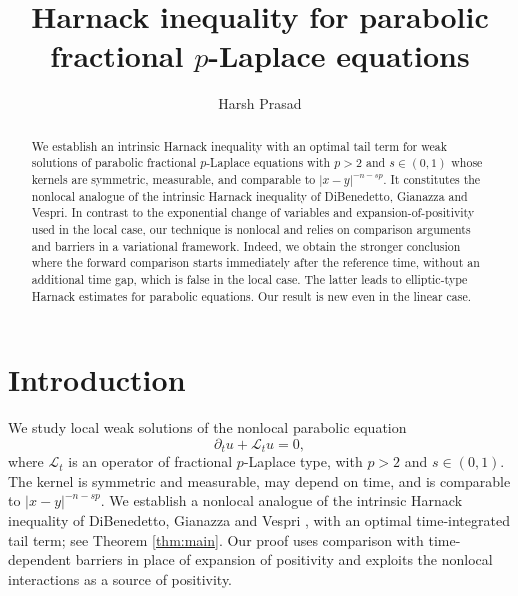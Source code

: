 \documentclass[10pt]{amsart}
\theoremstyle{plain}
\theoremstyle{definition}
\theoremstyle{remark}
\numberwithin{equation}{section}
\begin{document}
\title[Intrinsic Harnack inequality]
{Harnack inequality for parabolic fractional
$p$-Laplace equations}

\begin{abstract}
We establish an intrinsic Harnack inequality with an optimal tail term for weak solutions of parabolic fractional $p$-Laplace equations with $p>2$
and $s\in(0,1)$ whose kernels are symmetric, measurable, and
comparable to $|x-y|^{-n-sp}$. It constitutes the nonlocal analogue
of the intrinsic Harnack inequality of DiBenedetto, Gianazza and Vespri.
In contrast to the exponential change of variables  and expansion-of-positivity used in the local case,
our technique is nonlocal and relies on comparison arguments and barriers in a variational
framework. Indeed, we obtain the stronger conclusion where the forward comparison starts immediately after the reference time,
without an additional time gap, which is false in the local case. The latter leads
to elliptic-type Harnack estimates for parabolic equations. Our result is new even in the linear case.

\end{abstract}



\author[H.~Prasad]{Harsh Prasad}
\address[H.~Prasad]{Fakult\"at f\"ur Mathematik, Universit\"at Bielefeld,
33615 Bielefeld, Germany.}

\maketitle
\setcounter{tocdepth}{1}
\tableofcontents


\section{Introduction}


We study local weak solutions of the nonlocal parabolic equation
\[
\partial_tu+\mathcal L_tu=0,
\]
where $\mathcal L_t$ is an operator of fractional $p$-Laplace type,
with $p>2$ and $s\in(0,1)$. The kernel is symmetric and measurable,
may depend on time, and is comparable to $|x-y|^{-n-sp}$.
We establish a nonlocal analogue of the intrinsic Harnack inequality
of DiBenedetto, Gianazza and Vespri \cite{DGVActa,DGVDuke},
with an optimal time-integrated tail term; see Theorem \ref{thm:main}.
Our proof uses comparison with time-dependent barriers in place of
expansion of positivity and exploits the nonlocal interactions
as a source of positivity.
\end{document}
